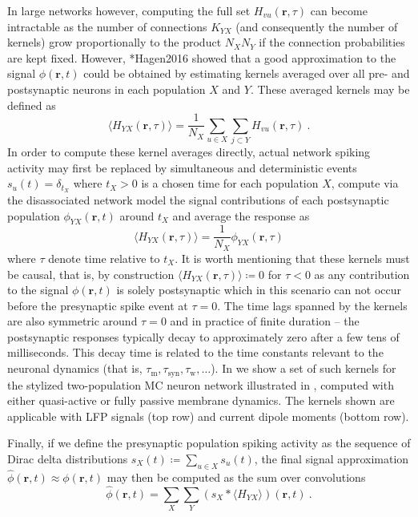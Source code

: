In large networks however,
computing the full set $H_{vu}(\mathbf{r},\tau)$ can become intractable as the number of connections $K_{YX}$ (and consequently the number of kernels) grow proportionally to the product $N_X N_Y$ if the connection probabilities are kept fixed.
However, \citeasnoun**{Hagen2016} showed that a good approximation to the signal $\phi(\mathbf{r}, t)$ could be obtained by estimating kernels averaged over all pre- and postsynaptic neurons in each population $X$ and $Y$. These averaged kernels may be defined as
\begin{equation}
\langle H_{YX} (\mathbf{r}, \tau) \rangle = \frac{1}{N_X} \sum_{u \in X} \sum_{j \subset Y} H_{vu}(\mathbf{r}, \tau)~.
\end{equation}
In order to compute these kernel averages directly,
actual network spiking activity may first be replaced by simultaneous and deterministic events
$s_u(t) = \delta_{t_X}$ where $t_X > 0$ is a chosen time for each population $X$,
compute via the disassociated network model the signal contributions of each postsynaptic population $\phi_{YX}(\mathbf{r}, t)$ around $t_X$
and average the response as
\begin{equation}
\langle H_{YX} (\mathbf{r}, \tau) \rangle = \frac{1}{N_X} \phi_{YX} (\mathbf{r}, \tau)
\end{equation}
where $\tau$ denote time relative to $t_X$.
It is worth mentioning that these kernels must be causal, that is,
by construction $\langle H_{YX}(\mathbf{r}, \tau) \rangle \coloneq 0$ for $\tau < 0$ as any contribution to the signal $\phi(\mathbf{r}, t)$ is solely postsynaptic which in this scenario can not occur before the presynaptic spike event at $\tau=0$.
The time lags spanned by the kernels are also symmetric around $\tau=0$ and in practice of finite duration --
the postsynaptic responses typically decay to approximately zero after a few tens of milliseconds.
This decay time is related to the time constants relevant to the neuronal dynamics (that is, $\tau_\text{m}, \tau_\text{syn}, \tau_\text{w}, \ldots$).  
In  we show a set of such kernels for the stylized two-population MC neuron network illustrated in , 
computed with either quasi-active or fully passive membrane dynamics. 
The kernels shown are applicable with LFP signals (top row) and current dipole moments (bottom row).



Finally, if we define the presynaptic population spiking activity as the sequence of Dirac delta distributions $s_X(t) \coloneq \sum_{u \in X} s_u(t)$,
the final signal approximation $\hat{\phi}(\mathbf{r}, t) \approx \phi(\mathbf{r}, t)$ may then be computed as the sum over convolutions
\begin{equation}
\hat{\phi}(\mathbf{r}, t) = \sum_X \sum_Y \left(s_X \ast \langle H_{YX} \rangle \right)(\mathbf{r}, t)~.
\end{equation}

